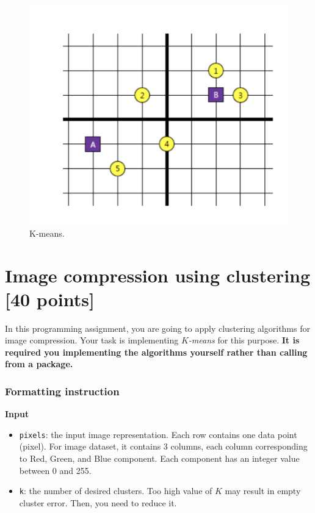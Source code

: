 \documentclass[twoside,10pt]{article}
\begin{document}
\begin{enumerate}
\begin{figure}[h!]
\begin{center}
\includegraphics[width = .8\textwidth]{points.png}
\end{center}
\caption{K-means.}
\end{figure}

\end{enumerate}


\clearpage

\section{Image compression using clustering [40 points]}

In this programming assignment, you are going to apply clustering algorithms for image compression. Your task is implementing \emph{$K$-means} for this purpose.  {\bf It is required you implementing the algorithms yourself rather than calling from a package.} 


\subsubsection*{Formatting instruction}


\textbf{Input}
\begin{itemize}
  \item \texttt{pixels}: the input image representation. Each row contains one data point (pixel). For image dataset, it contains 3 columns, each column corresponding to Red, Green, and Blue component. Each component has an integer value between 0 and 255.
  \item \texttt{k}: the number of desired clusters. Too high value of $K$ may result in empty cluster error. Then, you need to reduce it.
\end{itemize}
\end{document}
